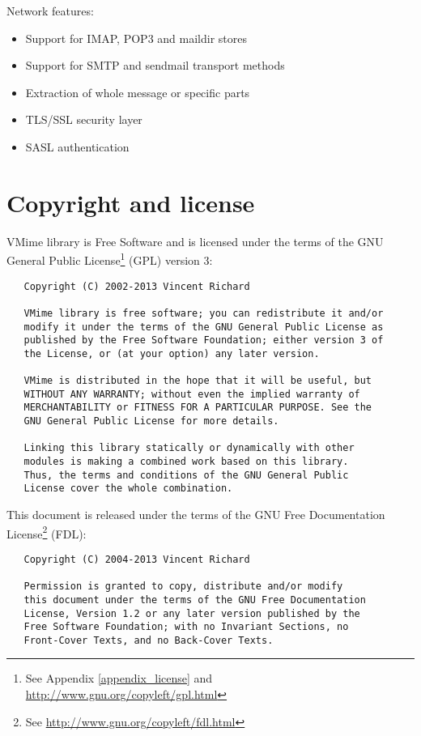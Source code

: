 \noindent Network features:

\begin{itemize}
\item Support for IMAP, POP3 and maildir stores
\item Support for SMTP and sendmail transport methods
\item Extraction of whole message or specific parts
\item TLS/SSL security layer
\item SASL authentication
\end{itemize}


\section{Copyright and license}

VMime library is Free Software and is licensed under the terms of the GNU
General Public License\footnote{See Appendix \ref{appendix_license} and
\url{http://www.gnu.org/copyleft/gpl.html}} (GPL) version 3:

\begin{verbatim}
   Copyright (C) 2002-2013 Vincent Richard

   VMime library is free software; you can redistribute it and/or
   modify it under the terms of the GNU General Public License as
   published by the Free Software Foundation; either version 3 of
   the License, or (at your option) any later version.

   VMime is distributed in the hope that it will be useful, but
   WITHOUT ANY WARRANTY; without even the implied warranty of
   MERCHANTABILITY or FITNESS FOR A PARTICULAR PURPOSE. See the
   GNU General Public License for more details.

   Linking this library statically or dynamically with other
   modules is making a combined work based on this library.
   Thus, the terms and conditions of the GNU General Public
   License cover the whole combination.
\end{verbatim}

\newpage
\noindent This document is released under the terms of the
GNU Free Documentation
License\footnote{See \url{http://www.gnu.org/copyleft/fdl.html}} (FDL):

\begin{verbatim}
   Copyright (C) 2004-2013 Vincent Richard

   Permission is granted to copy, distribute and/or modify
   this document under the terms of the GNU Free Documentation
   License, Version 1.2 or any later version published by the
   Free Software Foundation; with no Invariant Sections, no
   Front-Cover Texts, and no Back-Cover Texts.
\end{verbatim}

